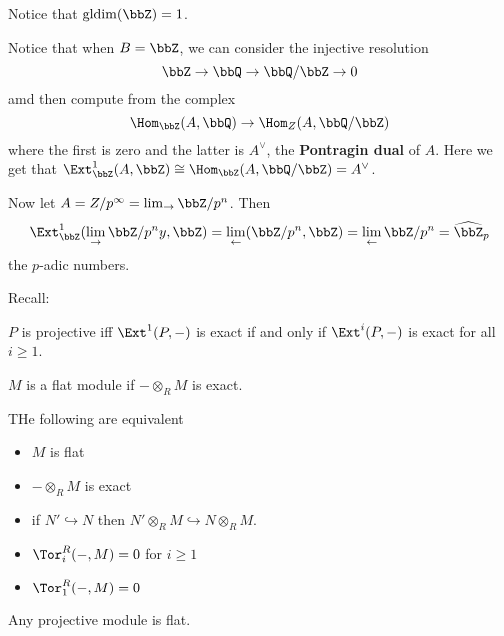 \documentclass[12pt]{article}
\begin{document}
\begin{rmk}
	Notice that $\operatorname{gldim}(\bbZ)=1$.
\end{rmk}
Notice that when $B=\bbZ$, we can consider the injective resolution
\[\bbZ\to \bbQ\to \bbQ/\bbZ\to 0\]
amd then compute from the complex
\[\Hom_\bbZ(A,\bbQ)\to\Hom_Z(A,\bbQ/\bbZ)\]
where the first is zero and the latter is $A^\vee$, the \textbf{Pontragin dual} of $A$. Here
we get that $\Ext_\bbZ^1(A,\bbZ)\cong \Hom_\bbZ(A,\bbQ/\bbZ)=A^\vee$.

Now let $A=Z/p^\infty=\lim_\to \bbZ/p^n$. Then 
\[\Ext_\bbZ^1(\lim_\to\bbZ/p^ny,\bbZ)=\lim_\leftarrow(\bbZ/p^n,\bbZ)=\lim_\leftarrow \bbZ/p^n=\widehat\bbZ_p\]
the $p$-adic numbers.

Recall:
\begin{lem}
	$P$ is projective iff $\Ext^1(P,-)$ is exact if and only if $\Ext^i(P,-)$ is exact for all $i\ge 1$.
\end{lem}
\begin{defn}
	$M$ is a flat module if $-\otimes_R M$ is exact.
\end{defn}
\begin{thm}
	THe following are equivalent
	\begin{itemize}
		\item $M$ is flat
		\item $-\otimes_RM$ is exact
		\item if $N'\hookrightarrow N$ then $N'\otimes_RM\hookrightarrow N\otimes_RM$.
		\item $\Tor_i^R(-,M)=0$ for $i\ge 1$
		\item $\Tor_1^R(-,M)=0$
	\end{itemize}
\end{thm}
\begin{rmk}
	Any projective module is flat.
\end{rmk}
\end{document}
